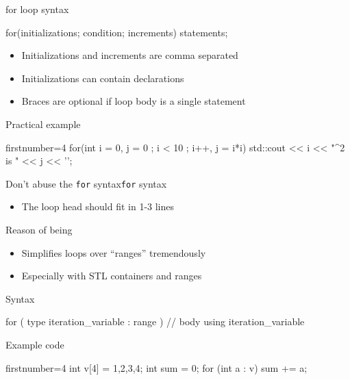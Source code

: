 \begin{frame}[fragile]
  \begin{block}{for loop syntax}
    \begin{cppcode*}{}
      for(initializations; condition; increments) {
        statements;
      }
    \end{cppcode*}
    \vspace{-0.2cm}
    \begin{itemize}
      \item Initializations and increments are comma separated
      \item Initializations can contain declarations
      \item Braces are optional if loop body is a single statement
    \end{itemize}
  \end{block}
  \pause
  \begin{exampleblock}{Practical example}
    \begin{cppcode*}{firstnumber=4}
      for(int i = 0, j = 0 ; i < 10 ; i++, j = i*i) {
        std::cout << i << "^2 is " << j << '\n';
      }
    \end{cppcode*}
  \end{exampleblock}
  \pause
  \begin{goodpracticeWithShortcut}{Don't abuse the \texttt{for} syntax}{\texttt{for} syntax}
    \begin{itemize}
      \item The  loop head should fit in 1-3 lines
    \end{itemize}
  \end{goodpracticeWithShortcut}
\end{frame}

\begin{frame}[fragile]
  \begin{block}{Reason of being}
    \begin{itemize}
    \item Simplifies loops over ``ranges'' tremendously
    \item Especially with STL containers and ranges
    \end{itemize}
  \end{block}
  \begin{block}{Syntax}
    \begin{cppcode*}{}
      for ( type iteration_variable : range ) {
        // body using iteration_variable
      }
    \end{cppcode*}
  \end{block}
  \begin{exampleblock}{Example code}
    \begin{cppcode*}{firstnumber=4}
      int v[4] = {1,2,3,4};
      int sum = 0;
      for (int a : v) { sum += a; }
    \end{cppcode*}
  \end{exampleblock}
\end{frame}

